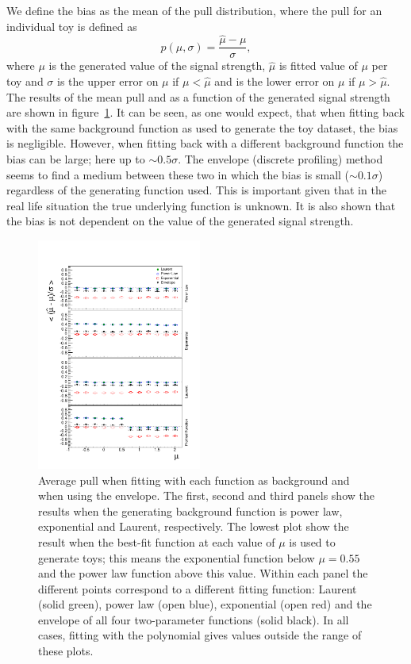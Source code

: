 We define the bias as the mean of the pull distribution, where the pull for an individual toy is defined as
\begin{equation}
	p(\mu,\sigma) = \frac{\hat{\mu}-\mu}{\sigma},
\end{equation}
where $\mu$ is the generated value of the signal strength, $\hat{\mu}$ is fitted value of $\mu$ per toy and $\sigma$ is the upper error on $\mu$ if $\mu<\hat{\mu}$ and is the lower error on $\mu$ if $\mu>\hat{\mu}$. The results of the mean pull and as a function of the generated signal strength are shown in figure~\ref{fig:functions:firstorderbias}. It can be seen, as one would expect, that when fitting back with the same background function as used to generate the toy dataset, the bias is negligible. However, when fitting back with a different background function the bias can be large; here up to $\sim 0.5\sigma$. The envelope (discrete profiling) method seems to find a medium between these two in which the bias is small ($\sim 0.1\sigma$) regardless of the generating function used. This is important given that in the real life situation the true underlying function is unknown.
It is also shown that the bias is not dependent on the value of the generated signal strength.
%
\begin{figure}[tbp]
\centering
\includegraphics[width=0.48\textwidth]{functions/FirstOrderFunctions.pdf}
\caption{Average pull when fitting with each function as background and when
using the envelope. The first, second and third panels show the results
when the generating background function is power law, exponential and Laurent,
respectively. The lowest plot show the result when the best-fit function at each
value of $\mu$ is used to generate toys; this means the exponential function
below $\mu = 0.55$ and the power law function above this value. Within each panel the different
points correspond to a different fitting function: Laurent (solid green), power law (open blue), exponential (open red) and the envelope of all four two-parameter functions (solid black). In all cases,
fitting with the polynomial gives values outside the range of these plots.}
\label{fig:functions:firstorderbias}
\end{figure}

